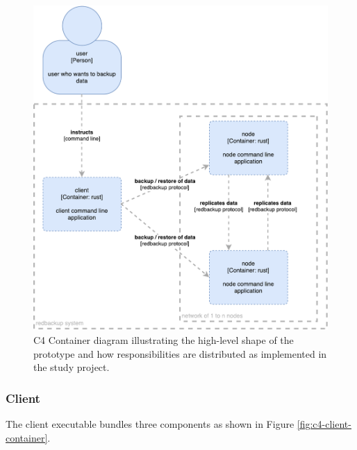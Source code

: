 \begin{figure}[h]
	\centering
	\includegraphics[width=1\linewidth]{resources/c4-sa-container}
	\caption[SA specific C4 Container diagram]{C4 Container diagram illustrating the high-level shape of the prototype and how responsibilities are distributed as implemented in the study project.}
	\label{fig:c4-sa-container}
\end{figure}

\subsubsection{Client}

The \gls{client} executable bundles three components as shown in Figure \ref{fig:c4-client-container}.

